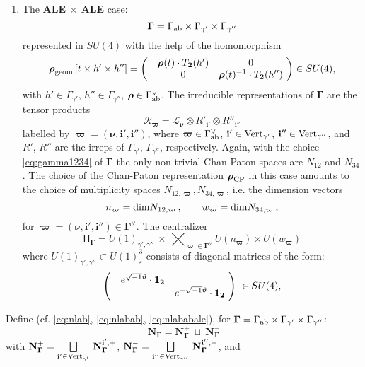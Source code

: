 \documentclass[12pt]{amsart}
\newcommand {\3}{\underline{\bf 3}}
\newcommand {\4}{\underline{\bf 4}}
\newcommand {\6}{\underline{\bf 6}}
\newcommand{\beq}{\begin{equation}}
\newcommand{\eeq}{\end{equation}}
\newcommand {\bN}   {\mathbf{N}}
\newcommand {\ib} {\mathbf{i}}
\newcommand {\Hf} {\mathsf{H}}
\newcommand {\bnu} {{\boldsymbol{\nu}}}
\newcommand {\bro} {{\boldsymbol{\rho}}}
\newcommand {\bom} {{\boldsymbol{\varpi}}}
\newcommand {\CalL} {\mathcal L}
\newcommand {\CalR} {\mathcal R}
\newcommand{\ve}{\varepsilon}
\newcommand{\Gammadi}{\boldsymbol{\Gamma}}
\newcommand{\Gamab}{{\Gamma}_{\rm ab}}
\newcommand{\Gamav}{{\Gamma}^{\vee}_{\rm ab}}
\begin{document}
\begin{enumerate}
\item The {\bf ALE $\times$ ALE} case:
\beq
{\Gammadi} = {\Gamab} \times {\Gamma}_{{\gamma}'} \times {\Gamma}_{{\gamma}''}
\label{eq:gamma1234}
\eeq
represented in $SU(4)$
with the help of the homomorphism 
$$
{\bro}_{\rm geom} \left[ t \times h' \times h''  \right]  = \left(  \begin{matrix} &{\bro}(t) \cdot T_{\bf 2} (h')  & 0 \\
& 0 &  {\bro}(t)^{-1} \cdot T_{\bf 2} (h'') \end{matrix} \ \right) \in SU(4)  , 
$$ 
with $h' \in {\Gamma}_{{\gamma}'}$, $h'' \in {\Gamma}_{{\gamma}''}$,  ${\bro}  \in {\Gamav}$. The irreducible representations of $\Gammadi$ are the tensor products 
\beq
{\CalR}_{\bom} = {\CalL}_{\bnu} \otimes R'_{\ib'} \otimes R''_{\ib''}
\eeq 
labelled by ${\bom} = ({\bnu}, {\ib}', {\ib}'')$, where ${\bom}  \in {\Gamav}$, ${\ib}' \in {\rm Vert}_{\gamma'}$, ${\ib}'' \in {\rm Vert}_{\gamma''}$, and $R'$, $R''$ are the irreps of ${\Gamma}_{\gamma'}$, ${\Gamma}_{\gamma''}$, respectively. Again, with the choice \eqref{eq:gamma1234} of $\mathbf\Gamma$ the only non-trivial Chan-Paton spaces are $N_{12}$ and $N_{34}$. The choice of the Chan-Paton representation ${\bro}_{\rm CP}$  in this case amounts to the choice of multiplicity spaces $N_{12, \bom}, N_{34,  \bom}$, i.e. the dimension vectors
\beq
n_{\bom} = {\rm dim} N_{12, \bom}\, , \qquad
w_{\bom} = {\rm dim} N_{34,  \bom} \, , 
\eeq
for ${\bom} = \left( {\bnu}, \ib', {\ib}'' \right) \in {\Gammadi}^{\vee}$. 
 The centralizer 
 \beq
{\Hf}_{\Gammadi} = U(1)_{\gamma' , \gamma''} \ \times \ \varprod_{{\bom} \in {\Gammadi}^{\vee}} U(n_{\bom}) \times  U(w_{\bom})
\label{eq:centra1234}
\eeq
where $U(1)_{\gamma', \gamma''} \subset U(1)^{3}_{\ve}$ consists of diagonal matrices of the form:
\beq
 \left(  \begin{matrix} &  e^{\sqrt{-1}{\vartheta}} \cdot {\bf 1}_{\bf 2} & \\
&   &  e^{- \sqrt{-1} {\vartheta}} \cdot {\bf 1}_{\bf 2} \end{matrix}  \ \right) \  \in SU(4)  , 
\eeq 
\end{enumerate}
Define (cf. \eqref{eq:nlab}, \eqref{eq:nlabab}, \eqref{eq:nlababale}), for ${\Gammadi}= {\Gamab} \times {\Gamma}_{\gamma'} \times {\Gamma}_{\gamma''}$:
\beq
{\bN}_{\Gammadi} = {\bN}_{\Gammadi}^{+} \ \sqcup \ {\bN}_{\Gammadi}^{-}
\label{eq:nlababaleale}
\eeq
with ${\bN}_{\Gammadi}^{+} = \bigsqcup\limits_{\ib' \in {\rm Vert}_{\gamma'}} \, {\bN}_{\Gammadi}^{{\ib}', +}$, ${\bN}_{\Gammadi}^{-} =  
 \bigsqcup\limits_{\ib'' \in {\rm Vert}_{\gamma''}} \, {\bN}_{\Gammadi}^{{\ib}'', -}$, and
\end{document}
